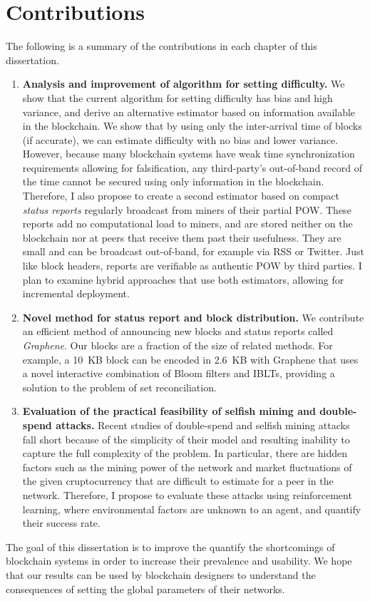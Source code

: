\section*{Contributions}
The following is a summary of the contributions in each chapter of this dissertation. 
\begin{enumerate}
\item \textbf{Analysis and improvement of algorithm for setting difficulty.} We show that the current algorithm for setting difficulty has bias and high variance, and derive an alternative estimator based on information available in the blockchain. We show that by using only the inter-arrival time of blocks (if accurate), we can estimate difficulty with no bias and lower variance. However, because many blockchain systems have weak time synchronization requirements allowing for falsification, any third-party's out-of-band record of the time cannot be secured using only information in the blockchain. Therefore, I also propose to create a second estimator based on compact {\em status reports} regularly broadcast from miners of their partial POW. These reports add no computational load to miners, and are stored neither on the blockchain nor at peers that receive them past their usefulness. They are small and can be broadcast out-of-band, for example via RSS or Twitter. Just like block headers, reports are verifiable as authentic POW by third parties. I plan to examine hybrid approaches that use both estimators, allowing for incremental deployment. 
\item \textbf{Novel method for status report and block distribution.} We contribute an efficient method of announcing new blocks and status reports called \textit{Graphene}. Our blocks are a fraction of the size of related methods.
For example, a 10~KB block can be encoded in 2.6~KB with Graphene that uses a novel interactive combination of Bloom filters\cite{Bloom:1970} and IBLTs\cite{goodrich:2011}, providing a solution to the problem of set reconciliation. 
\item \textbf{Evaluation of the practical feasibility of selfish mining and double-spend attacks.} Recent studies of double-spend and selfish mining attacks fall short because of the simplicity of their model and resulting inability to capture the full complexity of the problem. In particular, there are hidden factors such as the mining power of the network and market fluctuations of the given cruptocurrency that are difficult to estimate for a peer in the network. Therefore, I propose to evaluate these attacks using reinforcement learning, where environmental factors are unknown to an agent, and quantify their success rate. 
\end{enumerate}
The goal of this dissertation is to improve the quantify the shortcomings of blockchain systems in order to increase their prevalence and usability. We hope that our results can be used by blockchain designers to understand the consequences of setting the global parameters of their networks. 

